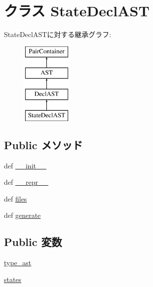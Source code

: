 \hypertarget{classslicc_1_1ast_1_1StateDeclAST_1_1StateDeclAST}{
\section{クラス StateDeclAST}
\label{classslicc_1_1ast_1_1StateDeclAST_1_1StateDeclAST}
}
StateDeclASTに対する継承グラフ:\begin{figure}[H]
\begin{center}
\leavevmode
\includegraphics[height=4cm]{classslicc_1_1ast_1_1StateDeclAST_1_1StateDeclAST}
\end{center}
\end{figure}
\subsection*{Public メソッド}
\begin{DoxyCompactItemize}
\item 
def \hyperlink{classslicc_1_1ast_1_1StateDeclAST_1_1StateDeclAST_ac775ee34451fdfa742b318538164070e}{\_\-\_\-init\_\-\_\-}
\item 
def \hyperlink{classslicc_1_1ast_1_1StateDeclAST_1_1StateDeclAST_ad8b9328939df072e4740cd9a63189744}{\_\-\_\-repr\_\-\_\-}
\item 
def \hyperlink{classslicc_1_1ast_1_1StateDeclAST_1_1StateDeclAST_a35b1a87f6fcbddeb5b793b0e415765f8}{files}
\item 
def \hyperlink{classslicc_1_1ast_1_1StateDeclAST_1_1StateDeclAST_a4555d1cee0dccf3942ea35fe86de2e8e}{generate}
\end{DoxyCompactItemize}
\subsection*{Public 変数}
\begin{DoxyCompactItemize}
\item 
\hyperlink{classslicc_1_1ast_1_1StateDeclAST_1_1StateDeclAST_a2c41e611550596541faa6f64ffecc139}{type\_\-ast}
\item 
\hyperlink{classslicc_1_1ast_1_1StateDeclAST_1_1StateDeclAST_aa19be6305a5a4485e1e70de70ed7d677}{states}
\end{DoxyCompactItemize}


